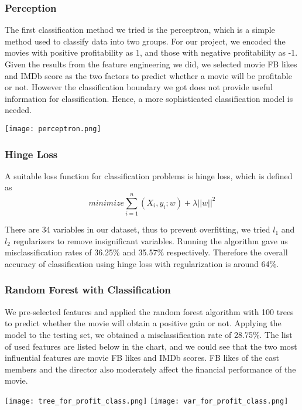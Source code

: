 \documentclass[12pt]{article}
\begin{document}
\subsubsection {Perception}
The first classification method we tried is the perceptron, which is a simple method  used to classify data into two groups. For our project, we encoded the movies with positive profitability as 1, and those with negative profitability as -1. Given the results from the feature engineering we did, we selected movie FB likes and IMDb score as the two factors to predict whether a movie will be profitable or not. However the classification boundary we got does not provide useful information for classification. Hence, a more sophisticated classification model is needed. 

\begin{center}
\texttt{[image: perceptron.png]}\\
\end{center}

\subsubsection {Hinge Loss}
A suitable loss function for classification problems is hinge loss, which is defined as $$minimize \sum_{i=1}^{n} (X_{i},y_{i}; w) + \lambda ||w||^{2}$$
\par
There are  34  variables in our dataset, thus to prevent overfitting, we tried $l_{1}$ and $l_{2}$ regularizers to remove insignificant variables. Running the algorithm gave us misclassification rates of  36.25\% and 35.57\% respectively. Therefore the overall accuracy of classification using hinge loss with regularization is around 64\%.

\subsubsection {Random Forest with Classification}
We pre-selected features and applied the random forest algorithm with 100 trees to predict whether the movie will obtain a positive gain or not. Applying the model to the testing set, we obtained a misclassification rate of 28.75\%. The list of used features are listed below in the chart, and we could see that the two most influential features are movie FB likes and IMDb scores. FB likes of the cast members and the director also moderately affect the financial performance of the movie. 
\begin{center}
\texttt{[image: tree\_for\_profit\_class.png]}
\texttt{[image: var\_for\_profit\_class.png]}\\
\end{center}
\end{document}
